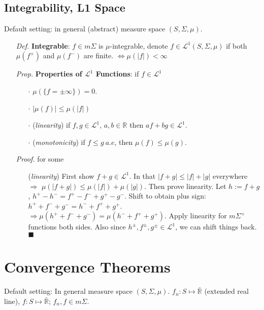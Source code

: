 \documentclass[a4paper,12pt,twoside]{book}
\begin{document}
\subsection{Integrability, L1 Space}
Default setting: in general (abstract) measure space $(S, \Sigma, \mu)$.
\begin{itemize}
	\item[\textit{Def.}] \textbf{Integrable}: $f\in m\Sigma$ is $\mu$-integrable, denote $f\in \mathcal{L}^1(S, \Sigma, \mu)$ if both $\mu(f^+)$ and $\mu(f^-)$ are finite. \newline
	$\iff \mu(|f|)<\infty$

	\item[\textit{Prop.}] \textbf{Properties of $\mathcal{L}^1$ Functions}: if $f\in \mathcal{L}^1$
	\begin{itemize} 
		\item[$\cdot$] $\mu(\{f=\pm\infty\})=0$.
		\item[$\cdot$] $|\mu(f)|\leq \mu(|f|)$
		\item[$\cdot$] (\textit{linearity}) if $f,g \in \mathcal{L}^1$, $a,b \in \mathbb{R}$ then $af+bg\in \mathcal{L}^1$.
		\item[$\cdot$] (\textit{monotonicity}) if $f\leq g~a.e$, then $\mu(f)\leq \mu(g)$.
	\end{itemize}

	\item[\textit{Proof.}] for some
	\begin{itemize}
		\item[] (\textit{linearity}) First show $f+g \in \mathcal{L}^1$. In that $|f+g|\leq |f|+|g|$ everywhere $\Rightarrow$ $\mu(|f+g|)\leq \mu(|f|)+\mu(|g|)$. \newline
		Then prove linearity. Let $h:=f+g$, $h^+-h^-=f^+-f^-+g^+-g^-$. Shift to obtain plus sign: $h^++f^-+g^-=h^-+f^++g^+$. $\Rightarrow \mu(h^++f^-+g^-)=\mu(h^-+f^++g^+)$. 
		Apply linearity for $m\Sigma^+$ functions both sides. Also since $h^{\pm},f^{\pm},g^{\pm} \in \mathcal{L}^1$, we can shift things back. $\blacksquare$
	
	\end{itemize}
\end{itemize}


\section{Convergence Theorems}
Default setting: In general measure space $(S, \Sigma, \mu)$. $f_n: S\mapsto \bar{\mathbb{R}}$ (extended real line), $f: S\mapsto \bar{\mathbb{R}}$; $f_n, f\in m\Sigma$.
\end{document}
